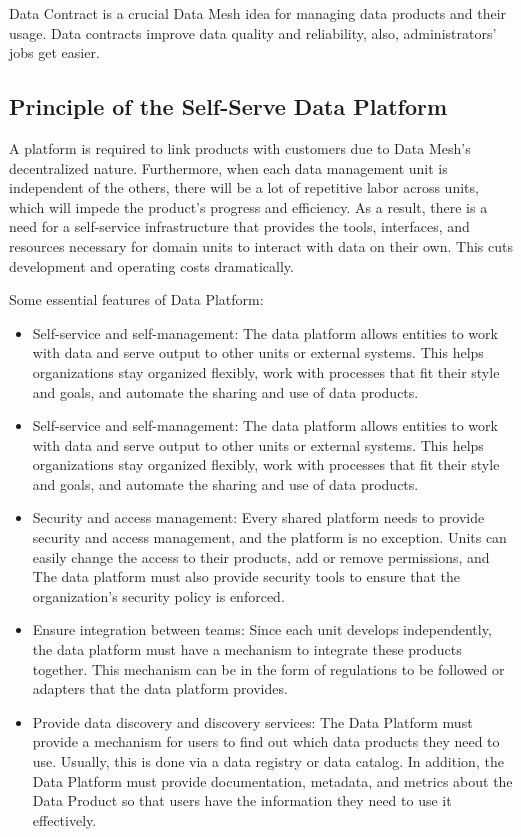 \documentclass[12pt, a4paper]{book}
\begin{document}
Data Contract is a crucial Data Mesh idea for managing data products and their usage. Data contracts improve data quality and reliability, also, administrators' jobs get easier.

\subsection{Principle of the Self-Serve Data Platform}
A platform is required to link products with customers due to Data Mesh's decentralized nature. Furthermore, when each data management unit is independent of the others, there will be a lot of repetitive labor across units, which will impede the product's progress and efficiency. As a result, there is a need for a self-service infrastructure that provides the tools, interfaces, and resources necessary for domain units to interact with data on their own. This cuts development and operating costs dramatically.

Some essential features of Data Platform:
	\begin{itemize}
		\item Self-service and self-management: The data platform allows entities to work with data and serve output to other units or external systems. This helps organizations stay organized flexibly, work with processes that fit their style and goals, and automate the sharing and use of data products.
		\item Self-service and self-management: The data platform allows entities to work with data and serve output to other units or external systems. This helps organizations stay organized flexibly, work with processes that fit their style and goals, and automate the sharing and use of data products.
		\item Security and access management: Every shared platform needs to provide security and access management, and the platform is no exception. Units can easily change the access to their products, add or remove permissions, and The data platform must also provide security tools to ensure that the organization's security policy is enforced.
		\item Ensure integration between teams: Since each unit develops independently, the data platform must have a mechanism to integrate these products together. This mechanism can be in the form of regulations to be followed or adapters that the data platform provides.
		\item Provide data discovery and discovery services: The Data Platform must provide a mechanism for users to find out which data products they need to use. Usually, this is done via a data registry or data catalog. In addition, the Data Platform must provide documentation, metadata, and metrics about the Data Product so that users have the information they need to use it effectively.
	\end{itemize}
\end{document}
